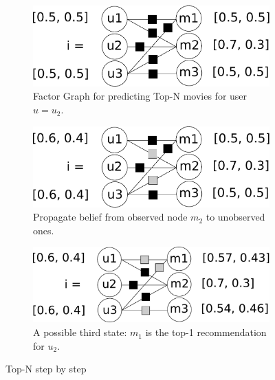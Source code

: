 \begin{figure}
	\centering
	\begin{subfigure}{\columnwidth}
	   \centering
	   \includegraphics[scale=0.33]{graphics/top-n-graph.pdf}%
	      \caption{Factor Graph for predicting Top-N movies for user $\hat u = u_2$.
	      \label{top_n_graph}
	   }
	\end{subfigure}\hfill%
	\vspace{5mm}
	\begin{subfigure}{\columnwidth}
	   \centering
	   \includegraphics[scale=0.33]{graphics/top-n-important-messages.pdf}%
      	   \caption{Propagate belief from observed node $m_2$ to unobserved ones.
	      \label{top_n_graph_important_msg}
	   }
	\end{subfigure}\hfill%
	\vspace{5mm}
	\begin{subfigure}{\columnwidth}
	   \centering
	   \includegraphics[scale=0.33]{graphics/top-n-final.pdf}%
	      \caption{A possible third state: $m_1$ is the top-1 recommendation for $u_2$. 
	      \label{top_n_graph_final_state}
	   }
	\end{subfigure}
	\caption{Top-N step by step}
\end{figure}


